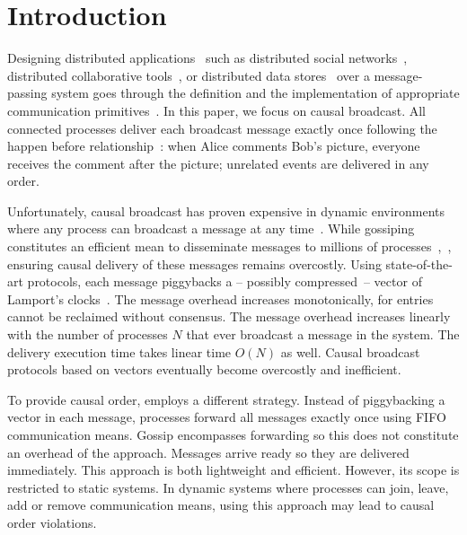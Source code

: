 
\section{Introduction}

Designing distributed applications~\cite{nakamoto2009bitcoin} such as
distributed social networks~\cite{borthakur2013petabyte}, distributed
collaborative tools~\cite{nedelec2016crate,heinrich2012exploiting}, or
distributed data
stores~\cite{demers1987epidemic,shapiro2011comprehensive,bailis2013bolton,lloyd2011cops,bravo2017saturn}
over a message-passing system goes through the definition and the implementation
of appropriate communication primitives~\cite{hadzilacos1994modular}.  In this
paper, we focus on causal broadcast.  All connected processes deliver each
broadcast message exactly once following the happen before
relationship~\cite{lamport1978time,schwarz1994detecting}: when Alice comments
Bob's picture, everyone receives the comment after the picture; unrelated events
are delivered in any order.

Unfortunately, causal broadcast has proven expensive in dynamic environments
where any process can broadcast a message at any
time~\cite{charronbost1991concerning}. While gossiping constitutes an efficient
mean to disseminate messages to millions of
processes~\cite{demers1987epidemic},~\cite{birman1999bimodal}, ensuring causal
delivery of these messages remains overcostly.  Using state-of-the-art
protocols, each message piggybacks a -- possibly compressed~-- vector of
Lamport's
clocks~\cite{almeida2008interval,fidge1988timestamps,mattern1989virtual,singhal1992efficient}.
The message overhead increases monotonically, for entries cannot be reclaimed
without consensus. The message overhead increases linearly with the number of
processes $N$ that ever broadcast a message in the system.  The delivery
execution time takes linear time $O(N)$ as well. Causal broadcast protocols
based on vectors eventually become overcostly and inefficient.


To provide causal order, \cite{friedman2004causal} employs a different
strategy. Instead of piggybacking a vector in each message, processes forward
all messages exactly once using FIFO communication means. Gossip encompasses
forwarding so this does not constitute an overhead of the approach.  Messages
arrive ready so they are delivered immediately. This approach is both
lightweight and efficient. However, its scope is restricted to static systems.
In dynamic systems where processes can join, leave, add or remove communication
means, using this approach may lead to causal order violations.


